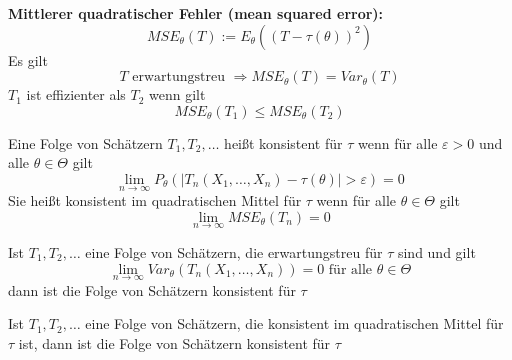 \documentclass[
	ngerman,
	accentcolor=9c,%
	type=intern,
	marginpar=false
	]{tudapub}
\begin{document}
            \textbf{Mittlerer quadratischer Fehler (mean squared error):}
            \begin{equation*}
                MSE_{\theta}(T) := E_\theta((T-\tau(\theta))^2) 
            \end{equation*}
            Es gilt
            \begin{equation*}
                T \text{ erwartungstreu } \Rightarrow MSE_\theta(T) = Var_\theta(T)
            \end{equation*}
            $T_1$ ist effizienter als $T_2$ wenn gilt 
            \begin{equation*}
                MSE_{\theta}(T_1) \leq MSE_{\theta}(T_2) 
            \end{equation*}
            \begin{definition}
                Eine Folge von Schätzern $T_1,T_2,\dots$ heißt konsistent für $\tau$ wenn für alle $\varepsilon > 0$ und alle $\theta \in \Theta$ gilt 
                \begin{equation*}
                    \lim_{n \rightarrow \infty} P_\theta(|T_n(X_1,\dots,X_n)-\tau(\theta)|>\varepsilon) = 0
                \end{equation*}
                Sie heißt konsistent im quadratischen Mittel für $\tau$ wenn für alle $\theta \in \Theta$ gilt
                \begin{equation*}
                    \lim_{n\rightarrow\infty}MSE_\theta(T_n) = 0
                \end{equation*}
            \end{definition}
            \begin{satz}
                Ist $T_1,T_2,\dots$ eine Folge von Schätzern, die erwartungstreu für $\tau$ sind und gilt 
                \begin{equation*}
                    \lim_{n\rightarrow \infty} Var_\theta(T_n(X_1,\dots,X_n))= 0 \text{ für alle } \theta \in \Theta
                \end{equation*}
                dann ist die Folge von Schätzern konsistent für $\tau$
            \end{satz}
            \begin{satz}
                Ist $T_1,T_2,\dots$ eine Folge von Schätzern, die konsistent im quadratischen Mittel für $\tau$ ist,
                dann ist die Folge von Schätzern konsistent für $\tau$
            \end{satz}
\end{document}
